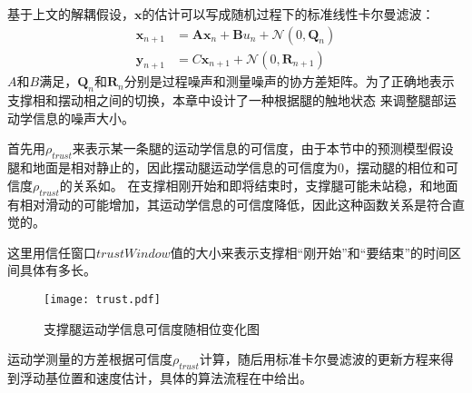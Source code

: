 \begin{algorithm}[htbp]
    \end{algorithm}
基于上文的解耦假设，$\boldsymbol{x}$的估计可以写成随机过程下的标准线性卡尔曼滤波：
\begin{equation}
    \label{equ:std_kf}
    \begin{aligned}
        \boldsymbol{x}_{n+1} & =\boldsymbol{A} \boldsymbol{x}_n+\boldsymbol{B} u_n+\mathcal{N}\left(0, \boldsymbol{Q}_n\right) \\
        \boldsymbol{y}_{n+1} & =C \boldsymbol{x}_{n+1}+\mathcal{N}\left(0, \boldsymbol{R}_{n+1}\right)
        \end{aligned}
\end{equation}
$A$和$B$满足，$\boldsymbol{Q}_n$和$\boldsymbol{R}_n$分别是过程噪声和测量噪声的协方差矩阵。为了正确地表示支撑相和摆动相之间的切换，本章中设计了一种根据腿的触地状态
来调整腿部运动学信息的噪声大小。

首先用$\rho_{trust}$来表示某一条腿的运动学信息的可信度，由于本节中的预测模型假设腿和地面是相对静止的，因此摆动腿运动学信息的可信度为0，摆动腿的相位和可信度$\rho_{trust}$的关系如。
在支撑相刚开始和即将结束时，支撑腿可能未站稳，和地面有相对滑动的可能增加，其运动学信息的可信度降低，因此这种函数关系是符合直觉的。

这里用信任窗口$trustWindow$值的大小来表示支撑相“刚开始”和“要结束”的时间区间具体有多长。
\begin{figure}[htbp]
    \centering
    \texttt{[image: trust.pdf]}
    \caption{\label{fig:kin_trust}支撑腿运动学信息可信度随相位变化图}
\end{figure}
运动学测量的方差根据可信度$\rho_{trust}$计算，随后用标准卡尔曼滤波的更新方程来得到浮动基位置和速度估计，具体的算法流程在中给出。
